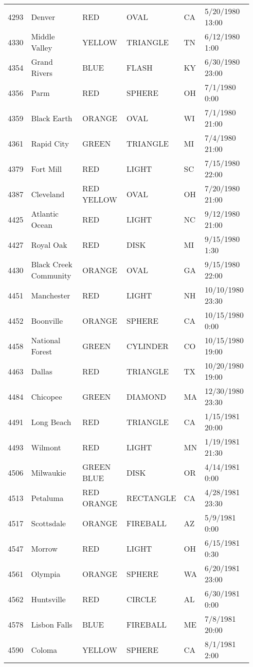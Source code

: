 \begin{tabular}{llllll}
4293 & Denver & RED & OVAL & CA & 5/20/1980 13:00 \\
4330 & Middle Valley & YELLOW & TRIANGLE & TN & 6/12/1980 1:00 \\
4354 & Grand Rivers & BLUE & FLASH & KY & 6/30/1980 23:00 \\
4356 & Parm & RED & SPHERE & OH & 7/1/1980 0:00 \\
4359 & Black Earth & ORANGE & OVAL & WI & 7/1/1980 21:00 \\
4361 & Rapid City & GREEN & TRIANGLE & MI & 7/4/1980 21:00 \\
4379 & Fort Mill & RED & LIGHT & SC & 7/15/1980 22:00 \\
4387 & Cleveland & RED YELLOW & OVAL & OH & 7/20/1980 21:00 \\
4425 & Atlantic Ocean & RED & LIGHT & NC & 9/12/1980 21:00 \\
4427 & Royal Oak & RED & DISK & MI & 9/15/1980 1:30 \\
4430 & Black Creek Community & ORANGE & OVAL & GA & 9/15/1980 22:00 \\
4451 & Manchester & RED & LIGHT & NH & 10/10/1980 23:30 \\
4452 & Boonville & ORANGE & SPHERE & CA & 10/15/1980 0:00 \\
4458 & National Forest & GREEN & CYLINDER & CO & 10/15/1980 19:00 \\
4463 & Dallas & RED & TRIANGLE & TX & 10/20/1980 19:00 \\
4484 & Chicopee & GREEN & DIAMOND & MA & 12/30/1980 23:30 \\
4491 & Long Beach & RED & TRIANGLE & CA & 1/15/1981 20:00 \\
4493 & Wilmont & RED & LIGHT & MN & 1/19/1981 21:30 \\
4506 & Milwaukie & GREEN BLUE & DISK & OR & 4/14/1981 0:00 \\
4513 & Petaluma & RED ORANGE & RECTANGLE & CA & 4/28/1981 23:30 \\
4517 & Scottsdale & ORANGE & FIREBALL & AZ & 5/9/1981 0:00 \\
4547 & Morrow & RED & LIGHT & OH & 6/15/1981 0:30 \\
4561 & Olympia & ORANGE & SPHERE & WA & 6/20/1981 23:00 \\
4562 & Huntsville & RED & CIRCLE & AL & 6/30/1981 0:00 \\
4578 & Lisbon Falls & BLUE & FIREBALL & ME & 7/8/1981 20:00 \\
4590 & Coloma & YELLOW & SPHERE & CA & 8/1/1981 2:00 \\

\end{tabular}
